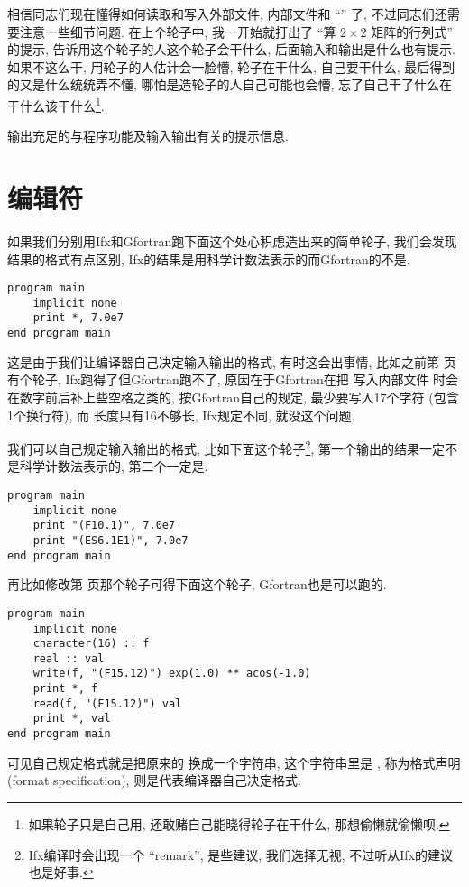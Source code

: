 相信同志们现在懂得如何读取和写入外部文件, 内部文件和 ``\ttt{*}'' 了, 不过同志们还需要注意一些细节问题. 在上个轮子中, 我一开始就打出了 ``算 $ 2\times2 $ 矩阵的行列式'' 的提示, 告诉用这个轮子的人这个轮子会干什么, 后面输入和输出是什么也有提示. 如果不这么干, 用轮子的人估计会一脸懵, 轮子在干什么, 自己要干什么, 最后得到的又是什么统统弄不懂, 哪怕是造轮子的人自己可能也会懵, 忘了自己干了什么在干什么该干什么\footnote{如果轮子只是自己用, 还敢赌自己能晓得轮子在干什么, 那想偷懒就偷懒呗.}. 
\begin{convention}
    输出充足的与程序功能及输入输出有关的提示信息. 
\end{convention}

\section{编辑符}\label{fortran_edit_descriptor}

如果我们分别用Ifx和Gfortran跑下面这个处心积虑造出来的简单轮子, 我们会发现结果的格式有点区别, Ifx的结果是用科学计数法表示的而Gfortran的不是. 
\begin{lstlisting}
program main
    implicit none
    print *, 7.0e7
end program main
\end{lstlisting}
这是由于我们让编译器自己决定输入输出的格式, 有时这会出事情, 比如之前第 \pageref{internal_file} 页有个轮子, Ifx跑得了但Gfortran跑不了, 原因在于Gfortran在把  写入内部文件  时会在数字前后补上些空格之类的, 按Gfortran自己的规定, 最少要写入17个字符 (包含1个换行符), 而  长度只有16不够长, Ifx规定不同, 就没这个问题. 

我们可以自己规定输入输出的格式, 比如下面这个轮子\footnote{Ifx编译时会出现一个 ``remark'', 是些建议, 我们选择无视, 不过听从Ifx的建议也是好事.}, 第一个输出的结果一定不是科学计数法表示的, 第二个一定是. 
\begin{lstlisting}
program main
    implicit none
    print "(F10.1)", 7.0e7
    print "(ES6.1E1)", 7.0e7
end program main
\end{lstlisting}
再比如修改第 \pageref{internal_file} 页那个轮子可得下面这个轮子, Gfortran也是可以跑的. 
\begin{lstlisting}
program main
    implicit none
    character(16) :: f
    real :: val
    write(f, "(F15.12)") exp(1.0) ** acos(-1.0)
    print *, f
    read(f, "(F15.12)") val
    print *, val
end program main
\end{lstlisting}
可见自己规定格式就是把原来的 \ttt{*} 换成一个字符串, 这个字符串里是 , 称为格式声明 (format specification), \ttt{*} 则是代表编译器自己决定格式. 

